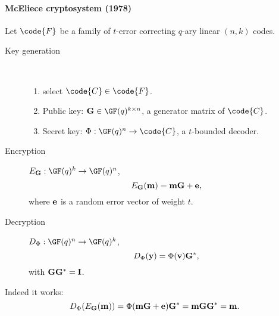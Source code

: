 \documentclass[a4paper, 11pt, openany]{book}
\begin{document}
\paragraph{McEliece cryptosystem (1978)}
Let $\code{F}$ be a family of $t$-error correcting $q$-ary linear $(n,k)$ codes.

\begin{description}
\item[Key generation]~
\begin{enumerate}
    \item select $\code{C} \in \code{F}$.

    \item Public key: ${\bf G} \in \GF(q)^{k \times n}$, a generator matrix of $\code{C}$.

    \item Secret key: $\Phi : \GF(q)^n \to \code{C}$, a $t$-bounded decoder.
\end{enumerate}

\item[Encryption] $E_{\bf G} : \GF(q)^k \to \GF(q)^n$,
\[
	E_{\bf G}( {\bf m} ) = {\bf m} {\bf G} + {\bf e},
\]
where ${\bf e}$ is a random error vector of weight $t$.

\item[Decryption] $D_\Phi : \GF(q)^n \to \GF(q)^k$,
\[
	D_\Phi({\bf y}) = \Phi({\bf v}) {\bf G}^*,
\]
with ${\bf G}{\bf G}^* = {\bf I}$.
\end{description}

Indeed it works:
\[
    D_\Phi( E_{\bf G}( {\bf m} ) ) = \Phi( {\bf m} {\bf G} + {\bf e} ) {\bf G}^* = {\bf m}{\bf G} {\bf G}^* = {\bf m}.
\]
\end{document}
